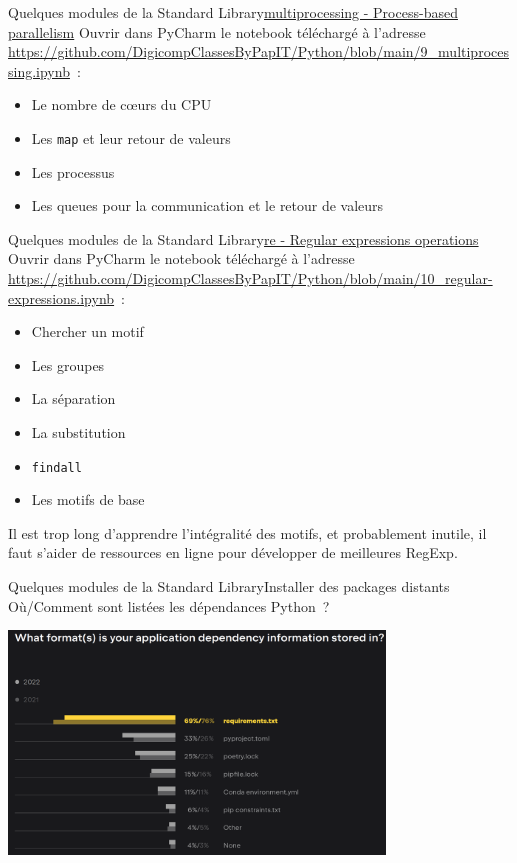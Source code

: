 \documentclass{beamer}
\begin{document}
    \begin{frame}{Quelques modules de la Standard Library}{\href{https://docs.python.org/3/library/multiprocessing.html}{multiprocessing - Process-based parallelism}}
        \bigbreak
        Ouvrir dans PyCharm le notebook téléchargé à l'adresse \url{https://github.com/DigicompClassesByPapIT/Python/blob/main/9_multiprocessing.ipynb}~:
        \begin{itemize}
            \item Le nombre de cœurs du CPU
            \item Les \lstinline{map} et leur retour de valeurs
            \item Les processus
            \item Les queues pour la communication et le retour de valeurs
        \end{itemize}
    \end{frame}


    \begin{frame}{Quelques modules de la Standard Library}{\href{https://docs.python.org/fr/3/library/re.html}{re - Regular expressions operations}}
        \bigbreak
        Ouvrir dans PyCharm le notebook téléchargé à l'adresse \url{https://github.com/DigicompClassesByPapIT/Python/blob/main/10_regular-expressions.ipynb}~:
        \begin{itemize}
            \item Chercher un motif
            \item Les groupes
            \item La séparation
            \item La substitution
            \item \lstinline{findall}
            \item Les motifs de base
        \end{itemize}
        \begin{dangercolorbox}
            Il est trop long d'apprendre l'intégralité des motifs, et probablement inutile, il faut s'aider de ressources en ligne pour développer de meilleures RegExp.
        \end{dangercolorbox}
    \end{frame}


    \begin{frame}{Quelques modules de la Standard Library}{Installer des packages distants}
        Où/Comment sont listées les dépendances Python~?
        \begin{center}
            \includegraphics[width=10cm]{image/survey_dependency_listing}
        \end{center}
    \end{frame}
\end{document}
